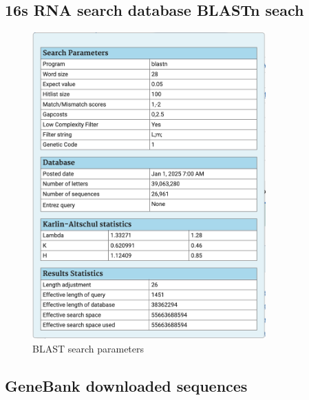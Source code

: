\documentclass{article}
\begin{document}
\subsection{16s RNA search database BLASTn seach}
\label{sec:16s_blast}

\begin{figure}[H]
    \centering
    \includegraphics[width=0.8\textwidth]{figs/blast_16s_params.png}
    \caption{BLAST search parameters}
\end{figure}

\subsection{GeneBank downloaded sequences}
\label{sec:genebank_seqs}
\end{document}
